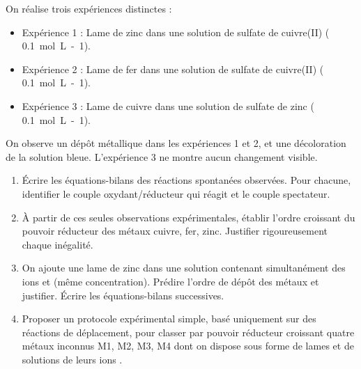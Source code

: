\documentclass[11pt]{article}
\begin{document}
\begin{exercice}
On réalise trois expériences distinctes :
\begin{itemize}
    \item Expérience 1 : Lame de zinc dans une solution de sulfate de cuivre(II) ( \SI{0,1}{mol.L-1}).
    \item Expérience 2 : Lame de fer dans une solution de sulfate de cuivre(II) ( \SI{0,1}{mol.L-1}).
    \item Expérience 3 : Lame de cuivre dans une solution de sulfate de zinc ( \SI{0,1}{mol.L-1}).
\end{itemize}
On observe un dépôt métallique dans les expériences 1 et 2, et une décoloration de la solution bleue. L'expérience 3 ne montre aucun changement visible.
\begin{enumerate}
    \item Écrire les équations-bilans des réactions spontanées observées. Pour chacune, identifier le couple oxydant/réducteur qui réagit et le couple spectateur.
    \item À partir de ces seules observations expérimentales, établir l'ordre croissant du pouvoir réducteur des métaux cuivre, fer, zinc. Justifier rigoureusement chaque inégalité.
    \item On ajoute une lame de zinc dans une solution contenant simultanément des ions  et  (même concentration). Prédire l'ordre de dépôt des métaux et justifier. Écrire les équations-bilans successives.
    \item Proposer un protocole expérimental simple, basé uniquement sur des réactions de déplacement, pour classer par pouvoir réducteur croissant quatre métaux inconnus M1, M2, M3, M4 dont on dispose sous forme de lames et de solutions de leurs ions .
\end{enumerate}
\end{exercice}
\end{document}
